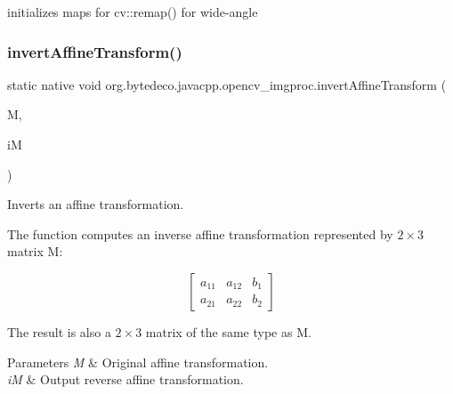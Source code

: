 initializes maps for cv\+::remap() for wide-\/angle \mbox{\label{group__imgproc__transform_ga4905a785b488db4f1dbb485efa98356c}} 
\subsubsection{\texorpdfstring{invert\+Affine\+Transform()}{invertAffineTransform()}}
{\footnotesize\ttfamily static native void org.\+bytedeco.\+javacpp.\+opencv\+\_\+imgproc.\+invert\+Affine\+Transform (\begin{DoxyParamCaption}\item[{@By\+Val Mat}]{M,  }\item[{@By\+Val Mat}]{iM }\end{DoxyParamCaption})\hspace{0.3cm}{\ttfamily [static]}}



Inverts an affine transformation. 

The function computes an inverse affine transformation represented by $2 \times 3$ matrix M\+: 

\[\begin{bmatrix} a_{11} & a_{12} & b_1 \\ a_{21} & a_{22} & b_2 \end{bmatrix}\] 

The result is also a $2 \times 3$ matrix of the same type as M. 


\begin{DoxyParams}{Parameters}
{\em M} & Original affine transformation. \\
\hline
{\em iM} & Output reverse affine transformation. \\
\hline
\end{DoxyParams}
\mbox{\label{group__imgproc__transform_ga46939c6aff509b593336b89237a563d3}} 
